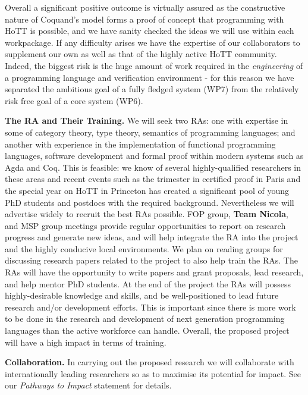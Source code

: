 \documentclass[a4paper,11pt]{article}
\begin{document}
Overall a significant positive outcome is virtually assured as the
constructive nature of Coquand's model forms a proof of concept that
programming with HoTT is possible, and we have sanity checked the
ideas we will use within each workpackage. If any difficulty arises we
have the expertise of our collaborators to supplement our own as well
as that of the highly active HoTT community. Indeed, the biggest risk
is the huge amount of work required in the {\em engineering} of a
programming language and verification environment - for this reason we
have separated the ambitious goal of a fully fledged system (WP7) from
the relatively risk free goal of a core system (WP6).

{\bf The RA and Their Training.} We will seek two RAs: one with
expertise in some of category theory, type theory, semantics of
programming languages; and another with experience in the
implementation of functional programming languages, software
development and formal proof within modern systems such as Agda and
Coq. This is feasible: we know of several highly-qualified researchers
in these areas and recent events such as the trimester in certified
proof in Paris and the special year on HoTT in Princeton has created a
significant pool of young PhD students and postdocs with the required
background. Nevertheless we will advertise widely to recruit the best RAs
possible. %
FOP group, {\bf Team Nicola}, and MSP group meetings
provide regular opportunities to report on research 
progress and generate new ideas, and will help integrate the RA into
the project and the highly conducive local environments.
We plan on reading groups for discussing research
papers 
related to the project to also help train the RAs. The RAs will have
the opportunity to write papers and grant proposals, lead research,
and help mentor PhD students.  At the end of the project the RAs will
possess highly-desirable knowledge and skills, and be well-positioned
to lead future research and/or development efforts. This is important
since there is more work to be done in the research and development of
next generation programming languages than the active workforce can
handle. Overall, the proposed project will have a high impact in terms
of training.

\vspace*{0.02in}

{\bf Collaboration.} In carrying out the proposed research we will
collaborate with internationally leading researchers so as to maximise
its potential for impact. See our {\em Pathways to
  Impact} statement for details.
\end{document}
